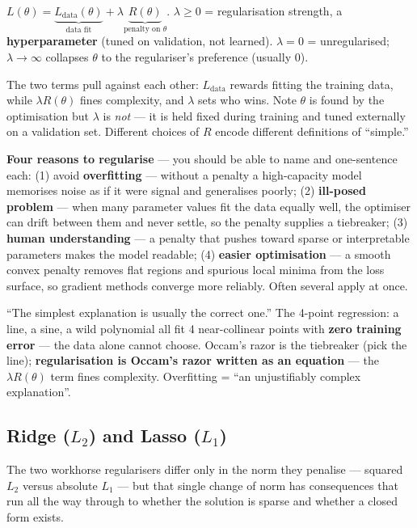 \documentclass[11pt, a4paper]{article}
\newcommand{\kw}[1]{\textbf{#1}}
\begin{document}
\begin{defbox}
$L(\theta)=\underbrace{L_{\text{data}}(\theta)}_{\text{data fit}}+\lambda\underbrace{R(\theta)}_{\text{penalty on }\theta}$.
$\lambda\ge0$ = regularisation strength, a \kw{hyperparameter} (tuned on validation, not learned).
$\lambda=0$ = unregularised; $\lambda\to\infty$ collapses $\theta$ to the regulariser's preference
(usually $0$).
\end{defbox}

The two terms pull against each other: $L_{\text{data}}$ rewards fitting the training data, while
$\lambda R(\theta)$ fines complexity, and $\lambda$ sets who wins. Note $\theta$ is found by the
optimisation but $\lambda$ is \emph{not} — it is held fixed during training and tuned externally on
a validation set. Different choices of $R$ encode different definitions of ``simple.''

\kw{Four reasons to regularise} — you should be able to name and one-sentence each: (1) avoid
\kw{overfitting} — without a penalty a high-capacity model memorises noise as if it were signal and
generalises poorly; (2) \kw{ill-posed problem} — when many parameter values fit the data equally
well, the optimiser can drift between them and never settle, so the penalty supplies a tiebreaker;
(3) \kw{human understanding} — a penalty that pushes toward sparse or interpretable parameters makes
the model readable; (4) \kw{easier optimisation} — a smooth convex penalty removes flat regions and
spurious local minima from the loss surface, so gradient methods converge more reliably. Often
several apply at once.

\begin{notebox}
``The simplest explanation is usually the correct one.'' The 4-point regression: a line, a sine, a
wild polynomial all fit 4 near-collinear points with \kw{zero training error} — the data alone
cannot choose. Occam's razor is the tiebreaker (pick the line); \kw{regularisation is Occam's razor
written as an equation} — the $\lambda R(\theta)$ term fines complexity. Overfitting = ``an
unjustifiably complex explanation''.
\end{notebox}

\subsection{Ridge ($L_2$) and Lasso ($L_1$)}

The two workhorse regularisers differ only in the norm they penalise — squared $L_2$ versus
absolute $L_1$ — but that single change of norm has consequences that run all the way through to
whether the solution is sparse and whether a closed form exists.
\end{document}
